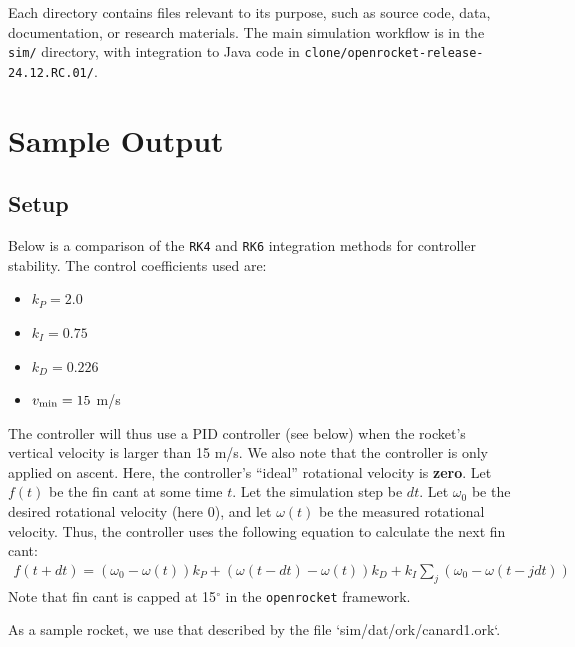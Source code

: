 \documentclass{amsdtx}
\begin{document}
Each directory contains files relevant to its purpose, such as source
code, data, documentation, or research materials. The main simulation
workflow is in the \texttt{sim/} directory, with integration to Java
code in \texttt{clone/openrocket-release-24.12.RC.01/}.
\newpage
\section{Sample Output}
\subsection{Setup}
Below is a comparison of the \verb|RK4| and \verb|RK6| integration methods for controller stability. The control coefficients used are:
\begin{multicols}{4}
\begin{itemize}
  \item $k_P=2.0$
  \item $k_I=0.75$
  \item $k_D=0.226$
  \item $v_{\rm min}=15$ m/s
\end{itemize}
\end{multicols}
The controller will thus use a PID controller (see below) when the rocket's vertical velocity is larger than 15 m/s. We also note that the controller is only applied on ascent. Here, the controller's ``ideal'' rotational velocity is \textbf{zero}. Let $f(t)$ be the fin cant at some time $t$. Let the simulation step be $dt$. Let $\omega_0$ be the desired rotational velocity (here $0$), and let $\omega(t)$ be the measured rotational velocity. Thus, the controller uses the following equation to calculate the next fin cant:
\begin{align}
  f(t+dt) = (\omega_0-\omega(t))k_P + (\omega(t-dt)-\omega(t))k_D + k_I\sum_j(\omega_0-\omega(t-jdt))
\end{align}
Note that fin cant is capped at 15$^\circ$ in the \verb|openrocket| framework.

As a sample rocket, we use that described by the file `sim/dat/ork/canard1.ork`.
\end{document}

